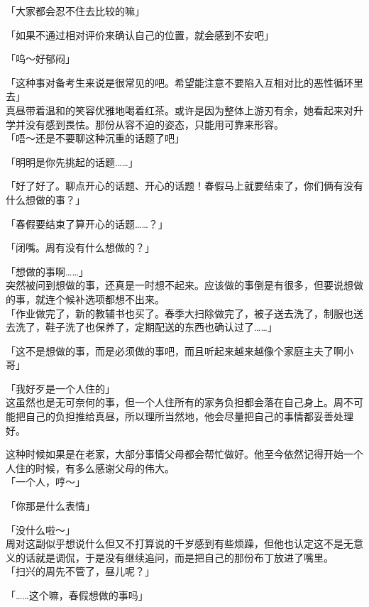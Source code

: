 「大家都会忍不住去比较的嘛」

「如果不通过相对评价来确认自己的位置，就会感到不安吧」

「呜～好郁闷」

「这种事对备考生来说是很常见的吧。希望能注意不要陷入互相对比的恶性循环里去」\\

真昼带着温和的笑容优雅地喝着红茶。或许是因为整体上游刃有余，她看起来对升学并没有感到畏怯。那份从容不迫的姿态，只能用可靠来形容。\\

「唔～还是不要聊这种沉重的话题了吧」

「明明是你先挑起的话题……」

「好了好了。聊点开心的话题、开心的话题！春假马上就要结束了，你们俩有没有什么想做的事？」

「春假要结束了算开心的话题……？」

「闭嘴。周有没有什么想做的？」

「想做的事啊……」\\

突然被问到想做的事，还真是一时想不起来。应该做的事倒是有很多，但要说想做的事，就连个候补选项都想不出来。\\

「作业做完了，新的教辅书也买了。春季大扫除做完了，被子送去洗了，制服也送去洗了，鞋子洗了也保养了，定期配送的东西也确认过了……」

「这不是想做的事，而是必须做的事吧，而且听起来越来越像个家庭主夫了啊小哥」

「我好歹是一个人住的」\\

这虽然也是无可奈何的事，但一个人住所有的家务负担都会落在自己身上。周不可能把自己的负担推给真昼，所以理所当然地，他会尽量把自己的事情都妥善处理好。

这种时候如果是在老家，大部分事情父母都会帮忙做好。他至今依然记得开始一个人住的时候，有多么感谢父母的伟大。\\

「一个人，哼～」

「你那是什么表情」

「没什么啦～」\\

周对这副似乎想说什么但又不打算说的千岁感到有些烦躁，但他也认定这不是无意义的话就是调侃，于是没有继续追问，而是把自己的那份布丁放进了嘴里。\\

「扫兴的周先不管了，昼儿呢？」

「……这个嘛，春假想做的事吗」\\

